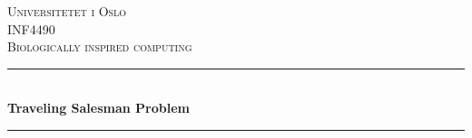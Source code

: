 \documentclass[a4paper, norsk, 12pt]{article}
\begin{document}
\begin{titlepage}

\newcommand{\HRule}{\rule{\linewidth}{0.5mm}} %

\center %


\textsc{\LARGE Universitetet i Oslo}\\[1.5cm] %
\textsc{\Large INF4490}\\[0.5cm] %
\textsc{\large Biologically inspired computing}\\[0.5cm] %


\HRule \\[0.4cm]
{ \huge \bfseries Traveling Salesman Problem}\\[0.4cm] %
\HRule \\[1.5cm]




\Large


\end{titlepage}
\end{document}
